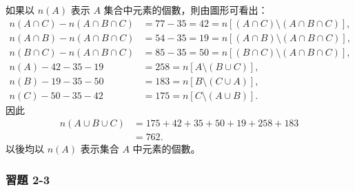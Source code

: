\begin{example}
如果以 $n(A)$ 表示 $A$ 集合中元素的個數，則由圖形可看出：
\begin{align*}
  n(A \cap C) - n(A \cap B \cap C) &= 77 - 35 = 42 = n[(A \cap C) \setminus (A \cap B \cap C)], \\
  n(A \cap B) - n(A \cap B \cap C) &= 54 - 35 = 19 = n[(A \cap B) \setminus (A \cap B \cap C)], \\
  n(B \cap C) - n(A \cap B \cap C) &= 85 - 35 = 50 = n[(B \cap C) \setminus (A \cap B \cap C)], \\
  n(A) - 42 - 35 - 19 &= 258 = n[A \setminus (B \cup C)], \\
  n(B) - 19 - 35 - 50 &= 183 = n[B \setminus (C \cup A)], \\
  n(C) - 50 - 35 - 42 &= 175 = n[C \setminus (A \cup B)].
\end{align*}
因此
\begin{align*}
  n(A \cup B \cup C) &= 175 + 42 + 35 + 50 + 19 + 258 + 183 \\
  &= 762.
\end{align*}
以後均以 $n(A)$ 表示集合 $A$ 中元素的個數。
\end{example}

\subsubsection*{習題 2-3}\label{sec:ex2-3}

